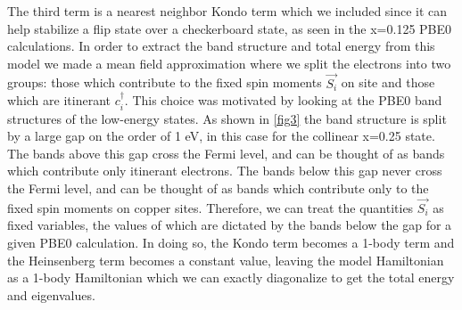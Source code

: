 \documentclass{article}
\begin{document}
The third term is a nearest neighbor Kondo term which we included since it can help stabilize a flip state over a checkerboard state, as seen in the x=0.125 PBE0 calculations. 
In order to extract the band structure and total energy from this model we made a mean field approximation where we split the electrons into two groups: those which contribute to the fixed spin moments $\vec{S_i}$ on site and those which are itinerant $c_i^\dagger$. 
This choice was motivated by looking at the PBE0 band structures of the low-energy states. 
As shown in \ref{fig3} the band structure is split by a large gap on the order of 1 eV, in this case for the collinear x=0.25 state. 
The bands above this gap cross the Fermi level, and can be thought of as bands which contribute only itinerant electrons. 
The bands below this gap never cross the Fermi level, and can be thought of as bands which contribute only to the fixed spin moments on copper sites. 
Therefore, we can treat the quantities $\vec{S_i}$ as fixed variables, the values of which are dictated by the bands below the gap for a given PBE0 calculation. 
In doing so, the Kondo term becomes a 1-body term and the Heinsenberg term becomes a constant value, leaving the model Hamiltonian as a 1-body Hamiltonian which we can exactly diagonalize to get the total energy and eigenvalues. 
\end{document}
